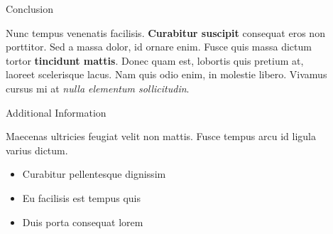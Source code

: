 \documentclass[final]{beamer}
\newlength{\sepwid}
\newlength{\onecolwid}
\newlength{\twocolwid}
\begin{document}
\begin{frame}[t]
\begin{columns}[t]
\begin{column}{\twocolwid}
\begin{columns}[t,totalwidth=\twocolwid]
      \end{columns} %

    \end{column} %

    \begin{column}{\sepwid}
    \end{column} %

    \begin{column}{\onecolwid} %


      \begin{block}{Conclusion}

        Nunc tempus venenatis facilisis. \textbf{Curabitur suscipit} consequat eros non porttitor. Sed a massa dolor, id ornare enim. Fusce quis massa dictum tortor \textbf{tincidunt mattis}. Donec quam est, lobortis quis pretium at, laoreet scelerisque lacus. Nam quis odio enim, in molestie libero. Vivamus cursus mi at \textit{nulla elementum sollicitudin}.

      \end{block}


      \begin{block}{Additional Information}

        Maecenas ultricies feugiat velit non mattis. Fusce tempus arcu id ligula varius dictum.
        \begin{itemize}
          \item Curabitur pellentesque dignissim
          \item Eu facilisis est tempus quis
          \item Duis porta consequat lorem
        \end{itemize}

      \end{block}



\end{column}
\end{columns}
\end{frame}
\end{document}
